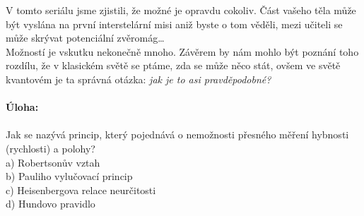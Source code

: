 \documentclass[crop=false]{standalone}
\begin{document}
V tomto seriálu jsme zjistili, že možné je opravdu cokoliv. Část vašeho těla může být vyslána na první interstelární misi aniž 
byste o tom věděli, mezi učiteli se může skrývat potenciální zvěromág\dots \\
Možností je vskutku nekonečně mnoho. Závěrem by nám 
mohlo být poznání toho rozdílu, že v klasickém světě se ptáme, zda se může něco stát, ovšem ve světě kvantovém je ta správná 
otázka: \textit{jak je to asi pravděpodobné?}
\\
\\
\textbf{Úloha:}
\\
\\
Jak se nazývá princip, který pojednává o nemožnosti přesného měření hybnosti (rychlosti) a polohy?
\\

a) Robertsonův vztah
\\

b) Pauliho vylučovací princip
\\

c) Heisenbergova relace neurčitosti
\\

d) Hundovo pravidlo
\end{document}
